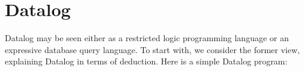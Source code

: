 









\section{Datalog}
\label{section-datalog}


Datalog may be seen either as a restricted logic programming language or an
expressive database query language. To start with, we consider the former view,
explaining Datalog in terms of deduction. Here is a simple Datalog program:

